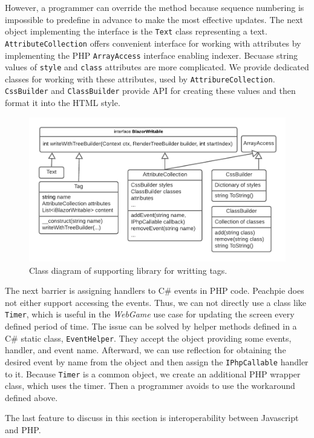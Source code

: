 However, a programmer can override the method because sequence numbering is impossible to predefine in advance to make the most effective updates.
The next object implementing the interface is the \texttt{Text} class representing a text.
\texttt{AttributeCollection} offers convenient interface for working with attributes by implementing the PHP \texttt{ArrayAccess} interface enabling indexer.
Becuase string values of \texttt{style} and \texttt{class} attributes are more complicated.
We provide dedicated classes for working with these attributes, used by \texttt{AttribureCollection}.
\texttt{CssBuilder} and \texttt{ClassBuilder} provide API for creating these values and then format it into the HTML style.
\par
\begin{figure}\centering
\includegraphics[scale=0.8]{./img/ComponentLibrary}
\caption{Class diagram of supporting library for writting tags.}
\label{img16:diagram}
\end{figure} 
\par
The next barrier is assigning handlers to C\# events in PHP code.
Peachpie does not either support accessing the events.
Thus, we can not directly use a class like \texttt{Timer}, which is useful in the \textit{WebGame} use case for updating the screen every defined period of time.
The issue can be solved by helper methods defined in a C\# static class, \texttt{EventHelper}.
They accept the object providing some events, handler, and event name.
Afterward, we can use reflection for obtaining the desired event by name from the object and then assign the \texttt{IPhpCallable} handler to it.
Because \texttt{Timer} is a common object, we create an additional PHP wrapper class, which uses the timer.
Then a programmer avoids to use the workaround defined above.
\par
The last feature to discuss in this section is interoperability between Javascript and PHP.
